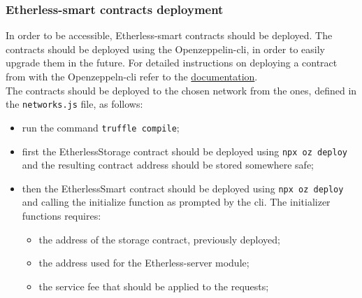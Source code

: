 \subsubsection{Etherless-smart contracts deployment}
	In order to be accessible, Etherless-smart contracts should be deployed. The contracts should be deployed using the Openzeppelin-cli, in order to easily upgrade them in the future. For detailed instructions on deploying a contract from with the Openzeppeln-cli refer to the \href{https://docs.openzeppelin.com/learn/deploying-and-interacting#deploying-a-smart-contract}{documentation}.\\
	The contracts should be deployed to the chosen network from the ones, defined in the \texttt{networks.js} file, as follows:
	\begin{itemize}
		\item run the command \texttt{truffle compile};
		\item first the EtherlessStorage contract should be deployed using \texttt{npx oz deploy} and the resulting contract address should be stored somewhere safe;
		\item then the EtherlessSmart contract should be deployed using \texttt{npx oz deploy} and calling the initialize function as prompted by the cli. The initializer functions requires:
		\begin{itemize}
			\item the address of the storage contract, previously deployed;
			\item the address used for the Etherless-server module;
			\item the service fee that should be applied to the requests;
		\end{itemize}
	\end{itemize}
